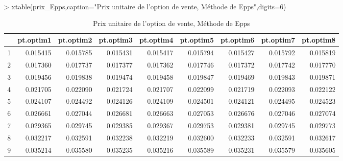 \documentclass[letter]{report}
\begin{document}
\begin{Schunk}
\begin{Sinput}
> 	xtable(prix_Epps,caption="Prix unitaire de l'option de vente, Méthode de Epps",digits=6)
\end{Sinput}
% latex table generated in R 3.0.3 by xtable 1.7-3 package
% Sat Mar 29 12:42:33 2014
\begin{table}[ht]
\centering
\begin{tabular}{rrrrrrrrr}
  \hline
 & pt.optim1 & pt.optim2 & pt.optim3 & pt.optim4 & pt.optim5 & pt.optim6 & pt.optim7 & pt.optim8 \\ 
  \hline
1 & 0.015415 & 0.015785 & 0.015431 & 0.015417 & 0.015794 & 0.015427 & 0.015792 & 0.015819 \\ 
  2 & 0.017360 & 0.017737 & 0.017377 & 0.017362 & 0.017746 & 0.017372 & 0.017742 & 0.017770 \\ 
  3 & 0.019456 & 0.019838 & 0.019474 & 0.019458 & 0.019847 & 0.019469 & 0.019843 & 0.019871 \\ 
  4 & 0.021705 & 0.022090 & 0.021724 & 0.021707 & 0.022099 & 0.021719 & 0.022093 & 0.022122 \\ 
  5 & 0.024107 & 0.024492 & 0.024126 & 0.024109 & 0.024501 & 0.024121 & 0.024495 & 0.024523 \\ 
  6 & 0.026661 & 0.027044 & 0.026681 & 0.026663 & 0.027053 & 0.026676 & 0.027046 & 0.027074 \\ 
  7 & 0.029365 & 0.029745 & 0.029385 & 0.029367 & 0.029753 & 0.029381 & 0.029745 & 0.029773 \\ 
  8 & 0.032217 & 0.032591 & 0.032238 & 0.032219 & 0.032600 & 0.032233 & 0.032591 & 0.032617 \\ 
  9 & 0.035214 & 0.035580 & 0.035235 & 0.035216 & 0.035589 & 0.035231 & 0.035579 & 0.035605 \\ 
   \hline
\end{tabular}
\caption{Prix unitaire de l'option de vente, Méthode de Epps} 
\end{table}\end{Schunk}
\end{document}
